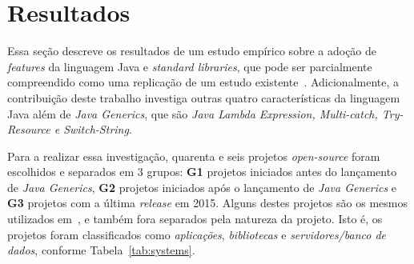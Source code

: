 \chapter{Resultados}\label{sec:resultados}

Essa seção descreve os resultados de 
um estudo empírico sobre a adoção de \textit{features} da 
linguagem Java e \textit{standard libraries}, que pode 
ser parcialmente compreendido como uma replicação de um estudo 
existente~\cite{Parnin:ACM2011}. Adicionalmente, a contribuição deste trabalho 
investiga outras quatro características da linguagem Java além de \textit{Java Generics}, 
que são \textit{Java Lambda Expression, Multi-catch, Try-Resource e Switch-String}.  



Para a realizar essa investigação, quarenta e seis projetos \textit{open-source} foram escolhidos e separados em 3 
grupos: \textbf{G1} projetos iniciados antes do lançamento de \textit{Java Generics}, \textbf{G2} projetos iniciados 
após o lançamento de \textit{Java Generics} e \textbf{G3} projetos com a última \textit{release} em 2015. 
Alguns destes projetos são os mesmos utilizados em~\cite{Parnin:ACM2011, Dyer:ACM2014, ward2015performance}, 
e também fora separados pela natureza da projeto. Isto é, os projetos foram 
classificados como \emph{aplicações}, \emph{bibliotecas} e \emph{servidores/banco de dados}, 
conforme Tabela~\ref{tab:systems}. 

